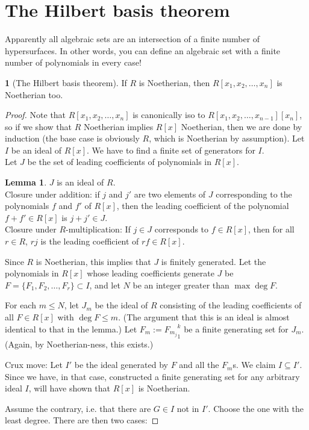 \documentclass{book}
\newcommand{\Rn}{R[x_1,x_2,\ldots,x_n]}
\theoremstyle{definition}
\newtheorem*{lem}{Lemma}
\theoremstyle{block}
\theoremstyle{thm}
\newtheorem*{thm}{}
\begin{document}
\section{The Hilbert basis theorem}
Apparently all algebraic sets are an intersection of a finite number of
hypersurfaces. In other words, you can define an algebraic set with a finite
number of polynomials in every case!
\begin{thm}[The Hilbert basis theorem] If $R$ is Noetherian, then $\Rn$ is
  Noetherian too. 
\end{thm}
\begin{proof}[Proof]
  Note that $\Rn$ is canonically iso to $R[x_1,x_2,\ldots,x_{n-1}][x_n]$, so if
  we show that $R$ Noetherian implies $R[x]$ Noetherian, then we are done by
  induction (the base case is obviously $R$, which is Noetherian by assumption).
  Let $I$ be an ideal of $R[x]$. We have to find a finite set of generators for
  $I$.\\
  Let $J$ be the set of leading coefficients of polynomials in $R[x]$. 
\begin{lem}$J$ is an ideal of $R$.\\
Closure under addition: if $j$ and $j'$ are two elements of $J$ corresponding to
the polynomials $f$ and $f'$ of $R[x]$, then the leading coefficient of the
polynomial $f+f'\in R[x]$ is $j+j'\in J$.\\
Closure under $R$-multiplication: If $j\in J$ corresponds to $f\in R[x]$, then for all $r\in R$, $rj$ is
the leading coefficient of $rf\in R[x]$. 
\end{lem}
Since $R$ is Noetherian, this implies that $J$ is finitely generated. Let the
polynomials in $R[x]$ whose leading coefficients generate $J$ be
$F=\{F_1,F_2,\ldots,F_r\}\subset I$, and let $N$ be an integer greater than
$\max\deg F$.\par
For each $m\leq N$, let $J_m$ be the ideal of $R$ consisting of the leading
coefficients of all $F\in R[x]$ with $\deg F\leq m$. (The argument that this is
an ideal is almost identical to that in the lemma.) Let $F_m:={F_{m_j}}_1^k$ be
a finite generating set for $J_m$. (Again, by Noetherian-ness, this exists.)\par
Crux move: Let $I'$ be the ideal generated by $F$ and all the $F_m$s. We claim
$I\subseteq I'$. Since we have, in that case, constructed a finite generating set for any
arbitrary ideal $I$, will have shown that $R[x]$ is Noetherian.\par
Assume the contrary, i.e. that there are $G\in I$ not in
$I'$. Choose the one with the least degree. There are then two cases:

\end{proof}
\end{document}
